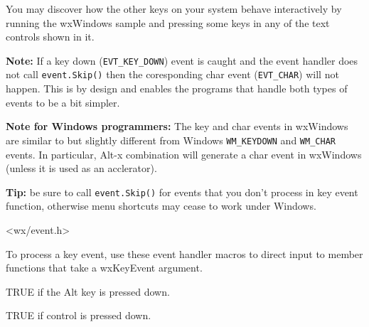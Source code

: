 You may discover how the other keys on your system behave interactively by
running the  wxWindows sample and pressing some keys
in any of the text controls shown in it.

{\bf Note:} If a key down ({\tt EVT\_KEY\_DOWN}) event is caught and
the event handler does not call {\tt event.Skip()} then the coresponding
char event ({\tt EVT\_CHAR}) will not happen.  This is by design and
enables the programs that handle both types of events to be a bit
simpler.

{\bf Note for Windows programmers:} The key and char events in wxWindows are
similar to but slightly different from Windows {\tt WM\_KEYDOWN} and
{\tt WM\_CHAR} events. In particular, Alt-x combination will generate a char
event in wxWindows (unless it is used as an acclerator).

{\bf Tip:} be sure to call {\tt event.Skip()} for events that you don't process in
key event function, otherwise menu shortcuts may cease to work under Windows.




<wx/event.h>


To process a key event, use these event handler macros to direct input to member
functions that take a wxKeyEvent argument.

\twocolwidtha{7cm}
\begin{twocollist}\itemsep=0pt
\end{twocollist}%





TRUE if the Alt key is pressed down.



TRUE if control is pressed down.

